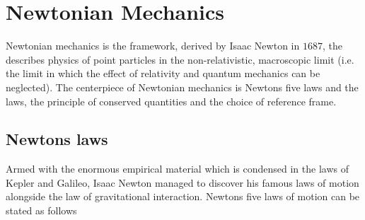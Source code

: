 \chapter{Newtonian Mechanics}
Newtonian mechanics is the framework, derived by Isaac Newton in $1687$, the describes physics of point particles in the non-relativistic, macroscopic limit (i.e. the limit in which the effect of relativity and quantum mechanics can be neglected). The centerpiece of Newtonian mechanics is Newtons five laws and the laws, the principle of conserved quantities and the choice of reference frame.


\section{Newtons laws}
Armed with the enormous empirical material which is condensed in the laws of Kepler and Galileo, Isaac Newton managed to discover his famous laws of motion alongside the law of gravitational interaction. Newtons five laws of motion can be stated as follows~\citep{hjort}
